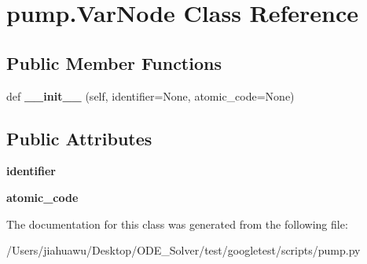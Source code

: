 \hypertarget{classpump_1_1_var_node}{}\section{pump.\+Var\+Node Class Reference}
\label{classpump_1_1_var_node}
\subsection*{Public Member Functions}
\begin{DoxyCompactItemize}
\item 
\mbox{\label{classpump_1_1_var_node_adf79bf21b1db5367792a4ac91f94a756}} 
def {\bfseries \+\_\+\+\_\+init\+\_\+\+\_\+} (self, identifier=None, atomic\+\_\+code=None)
\end{DoxyCompactItemize}
\subsection*{Public Attributes}
\begin{DoxyCompactItemize}
\item 
\mbox{\label{classpump_1_1_var_node_aa2b634e2443646c3754f2d193efa4dc7}} 
{\bfseries identifier}
\item 
\mbox{\label{classpump_1_1_var_node_ad6bef6a8577b994fbe9ccddf3c82d2fc}} 
{\bfseries atomic\+\_\+code}
\end{DoxyCompactItemize}


The documentation for this class was generated from the following file\+:\begin{DoxyCompactItemize}
\item 
/\+Users/jiahuawu/\+Desktop/\+O\+D\+E\+\_\+\+Solver/test/googletest/scripts/pump.\+py\end{DoxyCompactItemize}
